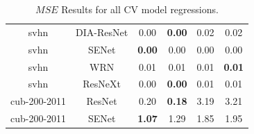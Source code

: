 \begin{table}[t]
\begin{center}
\begin{tabular}{|c|c|c|c|c|c|}
 svhn & DIA-ResNet  & 0.00 &  \textbf{0.00} & 0.02 & 0.02 \\
 svhn & SENet  & \textbf{0.00} &  0.00 & 0.00 & 0.00 \\
 svhn & WRN  & 0.01 &  0.01 & 0.01 & \textbf{0.01} \\
 svhn & ResNeXt  & 0.00 &  \textbf{0.00} & 0.01 & 0.01 \\
\hline
 cub-200-2011 & ResNet  & 0.20 &  \textbf{0.18} & 3.19 & 3.21 \\
 cub-200-2011 & SENet  & \textbf{1.07} &  1.29 & 1.85 & 1.95 \\
\hline
\end{tabular}
\end{center}
\caption{$MSE$ Results for all CV model regressions. }
\label{table:MSEresults}
\end{table}


